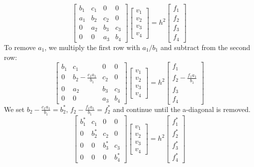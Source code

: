\documentclass{article}
\begin{document}
\begin{equation}
    \begin{bmatrix}
        b_1 & c_1 & 0 & 0 \\
        a_1 & b_2 & c_2 & 0 \\
        0 & a_2 & b_3 & c_3 \\
        0 & 0 & a_3 & b_4
    \end{bmatrix}
    \begin{bmatrix}
        v_1 \\ v_2 \\ v_3 \\v_4
    \end{bmatrix}
    =h^2\begin{bmatrix}
        f_1\\
        f_2\\
        f_3\\
        f_4
    \end{bmatrix}
\end{equation}
To remove $a_1$, we multiply the first row with $a_1/b_1$ and subtract from the second row: 
\begin{equation}
    \begin{bmatrix}
        b_1 & c_1 & 0 & 0 \\
        0 & b_2 - \frac{c_1a_1}{b_1} & c_2 & 0 \\
        0 & a_2 & b_3 & c_3 \\
        0 & 0 & a_3 & b_4
    \end{bmatrix}
    \begin{bmatrix}
        v_1 \\ v_2 \\ v_3 \\v_4
    \end{bmatrix}
    =h^2\begin{bmatrix}
        f_1\\
        f_2 - \frac{f_1a_1}{b_1}\\
        f_3\\
        f_4
    \end{bmatrix}
\end{equation}
We set $ b_2 - \frac{c_1a_1}{b_1}= b_2^*$, $f_2 - \frac{f_1a_1}{b_1} = f_2^*$ and continue until the a-diagonal is removed.
\begin{equation}
    \begin{bmatrix}
        b_1^* & c_1 & 0 & 0 \\
        0 & b_2^* & c_2 & 0 \\
        0 & 0 & b_3^* & c_3 \\
        0 & 0 & 0 & b_4^*
    \end{bmatrix}
    \begin{bmatrix}
        v_1 \\ v_2 \\ v_3 \\v_4
    \end{bmatrix}
    =h^2\begin{bmatrix}
        f_1^*\\
        f_2^*\\
        f_3^*\\
        f_4^*
    \end{bmatrix}
\end{equation}
\end{document}
